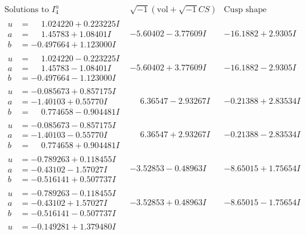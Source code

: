 \documentclass[1p]{elsarticle_modified}
\theoremstyle{definition}
\newcommand{\I}{\sqrt{-1}}
\begin{document}
$$\begin{array}{c|c|c}  
\text{Solutions to }I^u_{4}& \I (\text{vol} + \sqrt{-1}CS) & \text{Cusp shape}\\
 \hline 
\begin{aligned}
u &= \phantom{-}1.024220 + 0.223225 I \\
a &= \phantom{-}1.45783 + 1.08401 I \\
b &= -0.497664 + 1.123000 I\end{aligned}
 & -5.60402 - 3.77609 I & -16.1882 + 2.9305 I \\ \hline\begin{aligned}
u &= \phantom{-}1.024220 - 0.223225 I \\
a &= \phantom{-}1.45783 - 1.08401 I \\
b &= -0.497664 - 1.123000 I\end{aligned}
 & -5.60402 + 3.77609 I & -16.1882 - 2.9305 I \\ \hline\begin{aligned}
u &= -0.085673 + 0.857175 I \\
a &= -1.40103 + 0.55770 I \\
b &= \phantom{-}0.774658 - 0.904481 I\end{aligned}
 & \phantom{-}6.36547 - 2.93267 I & -0.21388 + 2.83534 I \\ \hline\begin{aligned}
u &= -0.085673 - 0.857175 I \\
a &= -1.40103 - 0.55770 I \\
b &= \phantom{-}0.774658 + 0.904481 I\end{aligned}
 & \phantom{-}6.36547 + 2.93267 I & -0.21388 - 2.83534 I \\ \hline\begin{aligned}
u &= -0.789263 + 0.118455 I \\
a &= -0.43102 - 1.57027 I \\
b &= -0.516141 + 0.507737 I\end{aligned}
 & -3.52853 - 0.48963 I & -8.65015 + 1.75654 I \\ \hline\begin{aligned}
u &= -0.789263 - 0.118455 I \\
a &= -0.43102 + 1.57027 I \\
b &= -0.516141 - 0.507737 I\end{aligned}
 & -3.52853 + 0.48963 I & -8.65015 - 1.75654 I \\ \hline\begin{aligned}
u &= -0.149281 + 1.379480 I \\

\end{aligned}
\end{array}$$
\end{document}
